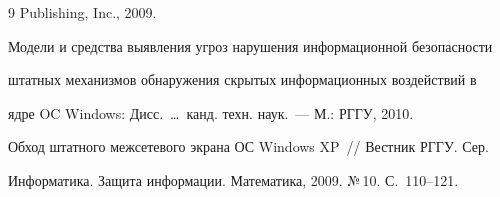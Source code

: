 {{\begin{thebibliography}{9}
Publishing, Inc., 2009.









Модели и средства выявления угроз нарушения информационной безопасности 


штатных механизмов обнаружения скрытых информационных воздействий в 


ядре OC Windows: Дисс.\ \ldots\ канд. техн. наук.~--- М.: РГГУ, 2010.








 \label{end\stat}


 






Обход штатного межсетевого экрана ОС Windows XP~/\!\!/ Вестник РГГУ. Сер. 


Информатика. Защита информации. Математика, 2009. №\,10. С.~110--121.


 


 \end{thebibliography}


}


}


